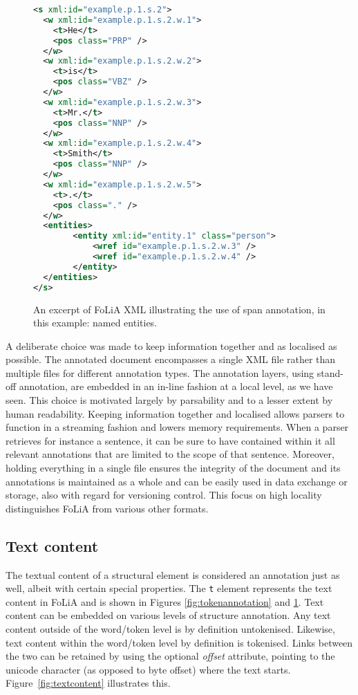\documentclass[a4paper,10pt,twoside]{article}
\begin{document}
\begin{figure}[tbh]
\begin{lstlisting}[language=xml]
<s xml:id="example.p.1.s.2">
  <w xml:id="example.p.1.s.2.w.1">
    <t>He</t>
    <pos class="PRP" />
  </w>
  <w xml:id="example.p.1.s.2.w.2">
    <t>is</t>
    <pos class="VBZ" />
  </w>
  <w xml:id="example.p.1.s.2.w.3">
    <t>Mr.</t>
    <pos class="NNP" />
  </w>
  <w xml:id="example.p.1.s.2.w.4">
    <t>Smith</t>
    <pos class="NNP" />
  </w>
  <w xml:id="example.p.1.s.2.w.5">
    <t>.</t>
    <pos class="." />
  </w>
  <entities>
        <entity xml:id="entity.1" class="person">
            <wref id="example.p.1.s.2.w.3" />
            <wref id="example.p.1.s.2.w.4" />
        </entity>
  </entities>
</s>
\end{lstlisting}
\caption{An excerpt of FoLiA XML illustrating the use of span annotation, in this example: named entities.\label{fig:spanannotation}}
\end{figure}

A deliberate choice was made to keep information together and as localised as
possible. The annotated document encompasses a single XML file rather than
multiple files for different annotation types. The annotation layers,  using
stand-off annotation, are embedded in an in-line fashion at a local level, as
we have seen. This choice is motivated largely by parsability and to a lesser
extent by human readability. Keeping information together and localised allows
parsers to function in a streaming fashion and lowers memory requirements. When
a parser retrieves for instance a sentence, it can be sure to have contained
within it all relevant annotations that are limited to the scope of that
sentence. Moreover, holding everything in a single file ensures the integrity
of the document and its annotations is maintained as a whole and can be easily
used in data exchange or storage, also with regard for versioning control. This
focus on high locality distinguishes FoLiA from various other formats. 

\subsection{Text content} 

The textual content of a structural element is considered an annotation just as well,
albeit with certain special properties. The \texttt{t} element represents the
text content in FoLiA and is shown in Figures  \ref{fig:tokenannotation} and
\ref{fig:spanannotation}. Text content can be embedded on various levels of
structure annotation. Any text content outside of the word/token level is by
definition untokenised. Likewise, text content within the word/token level by
definition is tokenised. Links between the two can be retained by using the
optional \emph{offset} attribute, pointing to the unicode character (as opposed
to byte offset) where the text starts. Figure~\ref{fig:textcontent} illustrates
this.
\end{document}
